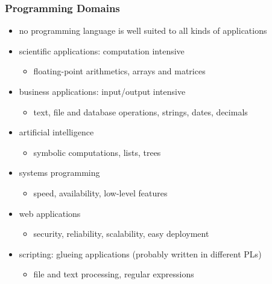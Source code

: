 \documentclass[dvipsnames]{beamer}
\theoremstyle{plain}
\begin{document}
\begin{frame}
  \frametitle{Programming Domains}

  \begin{itemize}
    \item no programming language is well suited to all kinds of applications

    \bigskip
    \item scientific applications: computation intensive
    \begin{itemize}
      \item floating-point arithmetics, arrays and matrices
    \end{itemize}
    
    \item business applications: input/output intensive
    \begin{itemize}
      \item text, file and database operations, strings, dates, decimals
    \end{itemize}
    
    \item artificial intelligence
    \begin{itemize}
      \item symbolic computations, lists, trees
    \end{itemize}
      
    \item systems programming
    \begin{itemize}
      \item speed, availability, low-level features
    \end{itemize}
      
    \item web applications
    \begin{itemize}
      \item security, reliability, scalability, easy deployment
    \end{itemize}
      
    \item scripting: glueing applications (probably written in different PLs)
    \begin{itemize}
      \item file and text processing, regular expressions
    \end{itemize}
  \end{itemize}
\end{frame}
\end{document}
